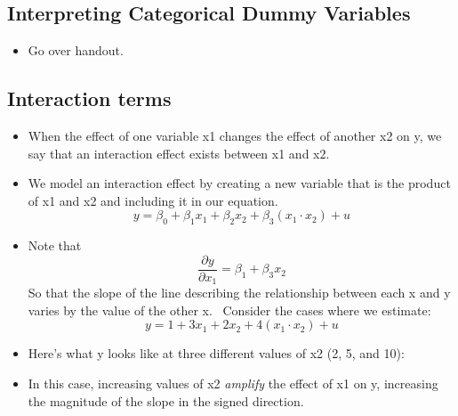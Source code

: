 \documentclass[11pt]{article}
\begin{document}
\subsection{Interpreting Categorical Dummy Variables}

\begin{itemize}
\item Go over handout.
\end{itemize}

\subsection{Interaction terms}

\begin{itemize}
\item When the effect of one variable x1 changes the effect of another x2 on
y, we say that an interaction effect exists between x1 and x2. \ \ 

\item We model an interaction effect by creating a new variable that is the
product of x1 and x2 and including it in our equation.%
\begin{equation*}
y=\beta _{0}+\beta _{1}x_{1}+\beta _{2}x_{2}+\beta _{3}\left( x_{1}\cdot
x_{2}\right) +u
\end{equation*}

\item Note that 
\begin{equation*}
\frac{\partial y}{\partial x_{1}}=\beta _{1}+\beta _{3}x_{2}
\end{equation*}%
So that the slope of the line describing the relationship between each x and
y varies by the value of the other x. \ Consider the cases where we estimate:%
\begin{equation*}
y=1+3x_{1}+2x_{2}+4\left( x_{1}\cdot x_{2}\right) +u
\end{equation*}

\item Here's what y looks like at three different values of x2 (2, 5, and
10):

\item In this case, increasing values of x2 \textit{amplify} the effect of
x1 on y, increasing the magnitude of the slope in the signed direction.


\end{itemize}
\end{document}
